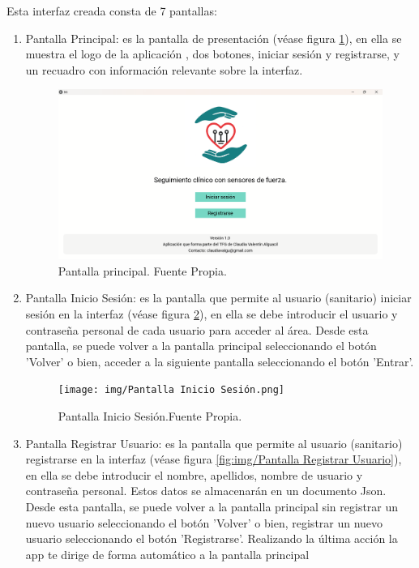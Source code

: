 Esta interfaz creada consta de 7 pantallas:
\begin{enumerate}
    \item Pantalla Principal: es la pantalla de presentación (véase figura \ref{fig:Pantalla principal}), en ella se muestra el logo de la aplicación , dos botones, iniciar sesión y registrarse, y un recuadro con información relevante sobre la interfaz.
    \begin{figure}
        \centering
        \includegraphics[width=1\linewidth]{img/Pantalla principal.png}
        \caption{Pantalla principal. Fuente Propia.}
        \label{fig:Pantalla principal}
    \end{figure}
    \item Pantalla Inicio Sesión: es la pantalla que permite al usuario (sanitario) iniciar sesión en la interfaz (véase figura \ref{fig:Pantalla Inicio Sesión}), en ella se debe introducir el usuario y contraseña personal de cada usuario para acceder al área. Desde esta pantalla, se puede volver a la pantalla principal seleccionando el botón 'Volver' o bien, acceder a la siguiente pantalla seleccionando el botón 'Entrar'.
\begin{figure}
    \centering
    \texttt{[image: img/Pantalla Inicio Sesión.png]}
    \caption{Pantalla Inicio Sesión.Fuente Propia.}
    \label{fig:Pantalla Inicio Sesión}
\end{figure}
    \item Pantalla Registrar Usuario: es la pantalla que permite al usuario (sanitario) registrarse en la interfaz (véase figura \ref{fig:img/Pantalla Registrar Usuario}), en ella se debe introducir el nombre, apellidos, nombre de usuario y contraseña personal. Estos datos se almacenarán en un documento Json. Desde esta pantalla, se puede volver a la pantalla principal sin registrar un nuevo usuario seleccionando el botón 'Volver' o bien, registrar un nuevo usuario seleccionando el botón 'Registrarse'. Realizando la última acción la app te dirige de forma automático a la pantalla principal

\end{enumerate}
